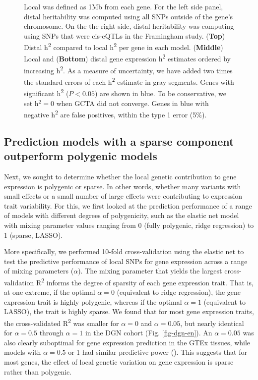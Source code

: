 \documentclass[10pt,letterpaper]{article}
\begin{document}
\begin{figure}[H]
{Local was defined as 1Mb from each gene. For the left side panel, distal heritability was computed using all SNPs outside of the gene's chromosome. On the the right side, distal heritability was computing using SNPs that were cis-eQTLs in the Framingham study.
%
(\textbf{Top}) Distal h\textsuperscript{2} compared to local
h\textsuperscript{2} per gene in each model. (\textbf{Middle}) Local and
(\textbf{Bottom}) distal gene expression h\textsuperscript{2} estimates
ordered by increasing h\textsuperscript{2}. 
As a measure of uncertainty, we have added two times the standard errors of each h\textsuperscript{2} estimate in gray segments. Genes with significant h\textsuperscript{2} ($P<0.05$) are shown in blue.  To be conservative, we set h$^2=0$ when GCTA did not converge. Genes in blue with negative h\textsuperscript{2} are false positives, within the type 1 error (5\%).
}
\label{fig-dgn-jt-h2}
\end{figure}


\subsection*{Prediction models with a sparse component outperform polygenic models}\label{the-effect-of-local-genetic-variation-on-gene-expression-is-sparse-rather-than-polygenic}

Next, we sought to determine whether the local genetic contribution to gene expression is polygenic or sparse. In other words, whether many variants with small effects or a small number of large effects were contributing to expression trait variability. For this, we first looked at the prediction performance of a range of models with different degrees of polygenicity, such as the elastic net model with  mixing parameter values ranging from 0 (fully polygenic, ridge regression) to 1 (sparse, LASSO).

More specifically, we performed 10-fold cross-validation using the elastic net \cite{Zou_2005} to test the predictive performance of local SNPs for gene expression across a range of mixing parameters ($\alpha$). The mixing parameter that yields the largest cross-validation R\textsuperscript{2} informs the degree of sparsity of each gene expression trait. That is, at one extreme, if the optimal \(\alpha=0\) (equivalent to ridge regression), the gene expression trait is highly polygenic, whereas if the optimal \(\alpha=1\) (equivalent to LASSO), the trait is highly sparse. We found that for most gene expression traits, the cross-validated R\textsuperscript{2} was smaller for \(\alpha=0\) and \(\alpha=0.05\), but nearly identical for \(\alpha=0.5\) through \(\alpha=1\) in the DGN cohort (Fig. \ref{fig-dgn-en}). An \(\alpha=0.05\) was also clearly suboptimal for gene expression prediction in the GTEx tissues, while models with \(\alpha=0.5\) or 1 had similar predictive power (). This suggests that for most genes, the effect of local genetic variation on gene expression is sparse rather than polygenic.
\end{document}
